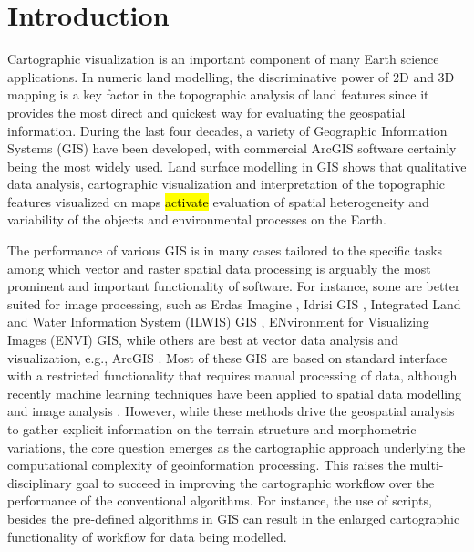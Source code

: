 \documentclass[land,article,submit,pdftex,moreauthors]{Definitions/mdpi}
\begin{document}
\section{Introduction}

Cartographic visualization is an important component of many Earth science applications. In numeric land modelling, the discriminative power of 2D and 3D mapping is a key factor in the topographic analysis of land features since it provides the most direct and quickest way for evaluating the geospatial information. During the last four decades, a variety of Geographic Information Systems (GIS) have been developed, with commercial ArcGIS software certainly being the most widely used. Land surface modelling in GIS shows that qualitative data analysis, cartographic visualization and interpretation of the topographic features visualized on maps \hl{activate} evaluation of spatial heterogeneity and variability of the objects and environmental processes on the Earth. 

The performance of various GIS is in many cases tailored to the specific tasks among which vector and raster spatial data processing is arguably the most prominent and important functionality of software. For instance, some are better suited for image processing, such as Erdas Imagine \cite{IWAHASHI2010202}, Idrisi GIS \cite{land10040379,AYALEW200515}, Integrated Land and Water Information System (ILWIS) GIS \cite{BABIKER2005127}, ENvironment for Visualizing Images (ENVI) GIS, while others are best at vector data analysis and visualization, e.g., ArcGIS \cite{OHTA2022108201,IKEMI2017115,IWAHASHI201229,NAKAYAMA2023110243,HANAOKA2014274}.
Most of these GIS are based on standard interface with a restricted functionality that requires manual processing of data, although recently machine learning techniques have been applied to spatial data modelling \cite{THONGTHAMMACHART2022105447} and image analysis \cite{ALIFU2020107365,CARRASCO2022277}. However, while these methods drive the geospatial analysis to gather explicit information on the terrain structure and morphometric variations, the core question emerges as the cartographic approach underlying the computational complexity of geoinformation processing. This raises the multi-disciplinary goal to succeed in improving the cartographic workflow over the performance of the conventional algorithms. For instance, the use of scripts, besides the pre-defined algorithms in GIS can result in the enlarged cartographic functionality of workflow for data being modelled. 
\end{document}
